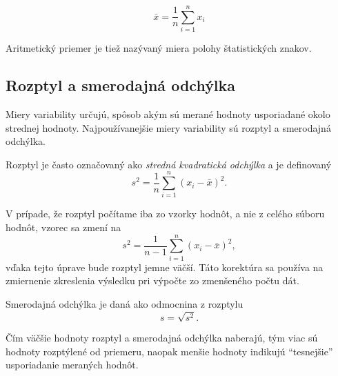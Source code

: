 \begin{equation}
\bar{x} = \frac{1}{n} \sum\limits_{i=1}^{n} x_i
\end{equation}

Aritmetický priemer je tiež nazývaný miera polohy štatistických znakov.

\subsection{Rozptyl a smerodajná odchýlka}

Miery variability určujú, spôsob akým sú merané hodnoty usporiadané okolo strednej hodnoty. Najpoužívanejšie miery variability sú rozptyl a smerodajná odchýlka.

Rozptyl je  často označovaný ako \textit{stredná kvadratická odchýlka} a je definovaný
\begin{equation}
s^2 = \frac{1}{n}\sum\limits_{i=1}^{n}(x_i - \bar{x})^2.
\end{equation}

V prípade, že rozptyl počítame iba zo vzorky hodnôt, a nie z celého súboru hodnôt, vzorec sa zmení na
 \begin{equation}
s^2 = \frac{1}{n-1}\sum\limits_{i=1}^{n}(x_i - \bar{x})^2,
\end{equation}
vďaka tejto úprave bude rozptyl jemne väčší. Táto korektúra sa používa na zmiernenie zkreslenia výsledku pri výpočte zo zmenšeného počtu dát.

Smerodajná odchýlka je daná ako odmocnina z rozptylu
\begin{equation}
s = \sqrt{s^2}.
\end{equation}

Čím väčšie hodnoty rozptyl a smerodajná odchýlka naberajú, tým viac sú hodnoty rozptýlené od priemeru, naopak menšie hodnoty indikujú ``tesnejšie'' usporiadanie meraných hodnôt.


